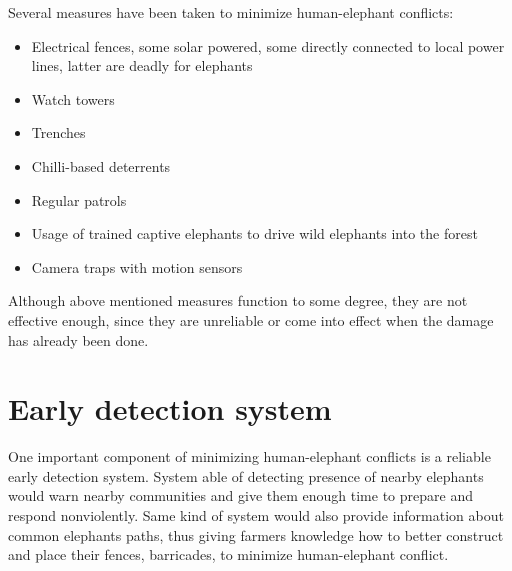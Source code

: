 Several measures have been taken to minimize human-elephant conflicts:
\begin{itemize}
    \item Electrical fences, some solar powered, some directly connected to local power lines, latter are deadly for elephants
    \item Watch towers
    \item Trenches
    \item Chilli-based deterrents
    \item Regular patrols
    \item Usage of trained captive elephants to drive wild elephants into the forest
    \item Camera traps with motion sensors
\end{itemize}

Although above mentioned measures function to some degree, they are not effective enough, since they are unreliable or come into effect when the damage has already been done\cite{wildlabs}. 

\section{ Early detection system}

One important component of minimizing human-elephant conflicts is a reliable early detection system. 
System able of detecting presence of nearby elephants would warn nearby communities and give them enough time to prepare and respond nonviolently.
Same kind of system would also provide information about common elephants paths, thus giving farmers knowledge how to better construct and place their fences, barricades, to minimize human-elephant conflict.

